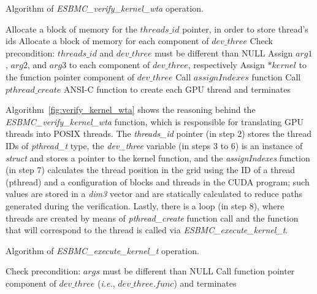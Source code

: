 \documentclass[times, doublespace]{cpeauth}
\begin{document}
\begin{algorithm}
\caption{Algorithm of \textit{ESBMC\_verify\_kernel\_wta} operation.}
\label{fig:verify_kernel_wta}
\begin{algorithmic}[1]
  \State Allocate a block of memory for the $threads\_id$ pointer, in order to store thread's ids
  \State Allocate a block of memory for each component of $dev\_three$
	\State Check precondition: $threads\_id$ and $dev\_three$ must be different than NULL
  \State Assign $arg1$, $arg2$, and $arg3$ to each component of $dev\_three$, respectively
  \State Assign $*kernel$ to the function pointer component of $dev\_three$
  \State Call $assignIndexes$ function
  \State Call $pthread\_create$ ANSI-C function to create each GPU thread and terminates
  \EndProcedure
\end{algorithmic}
\end{algorithm}

Algorithm~\ref{fig:verify_kernel_wta} shows the reasoning behind the \textit{ESBMC\_verify\_kernel\_wta} function, which is responsible for translating GPU threads into POSIX threads. The \textit{threads\_id} pointer (in step $2$) stores the thread IDs of \textit{pthread\_t} type, the \textit{dev\_three} variable (in steps $3$ to $6$) is an instance of \textit{struct} and stores a pointer to the kernel function, and the \textit{assignIndexes} function (in step $7$) calculates the thread position in the grid using the ID of a thread (pthread) and a configuration of blocks and threads in the CUDA program; such values are stored in a \textit{dim3} vector and are statically calculated to reduce paths generated during the verification. Lastly, there is a loop (in step $8$), where threads are created by means of \textit{pthread\_create} function call and the function that will correspond to the thread is called via \textit{ESBMC\_execute\_kernel\_t}.

\begin{algorithm}
\caption{Algorithm of \textit{ESBMC\_execute\_kernel\_t} operation.}
\label{fig:execute_kernel_t}
\begin{algorithmic}[1]
	\State Check precondition: $args$ must be different than NULL
  \State Call function pointer component of $dev\_three$ (\textit{i.e.}, $dev\_three.func$) and terminates
  \EndProcedure
\end{algorithmic}
\end{algorithm}
\end{document}
